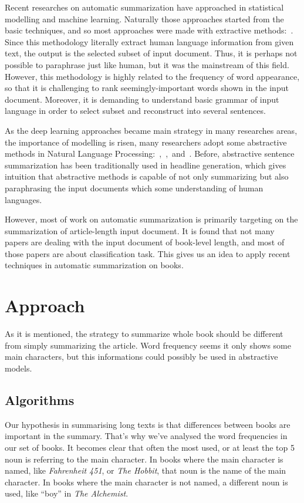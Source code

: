 Recent researches on automatic summarization have approached in statistical
modelling and machine learning. Naturally those approaches started from the
basic techniques, and so most approaches were made with extractive
methods:~\cite{2017arXiv170804439V}. Since this methodology literally extract
human language information from given text, the output is the selected subset
of input document. Thus, it is perhaps not possible to paraphrase just like
human, but it was the mainstream of this field. However, this methodology is
highly related to the frequency of word appearance, so that it is challenging
to rank seemingly-important words shown in the input document. Moreover, it is
demanding to understand basic grammar of input language in order to select
subset and reconstruct into several sentences.

As the deep learning approaches became main strategy in many researches areas,
the importance of modelling is risen, many researchers adopt some abstractive
methods in Natural Language
Processing:~\cite{2016arXiv160206023N},~\cite{2017arXiv170404368S},~and~\cite{Rush2015}.
Before, abstractive sentence summarization has been traditionally used in
headline generation, which gives intuition that abstractive methods is capable
of not only summarizing but also paraphrasing the input documents which some
understanding of human languages. 

However, most of work on automatic summarization is primarily targeting on
the summarization of article-length input document. It is found that not many
papers are dealing with the input document of book-level length, and most of
those papers are about classification task. This gives us an idea to apply
recent techniques in automatic summarization on books.


\section{Approach}
As it is mentioned, the strategy to summarize whole book should be different
from simply summarizing the article. Word frequency seems it only shows some
main characters, but this informations could possibly be used in abstractive
models. 


\subsection{Algorithms}

Our hypothesis in summarising long texts is that differences between books are
important in the summary. That's why we've analysed the word frequencies in our
set of books. It becomes clear that often the most used, or at least the top 5
noun is referring to the main character. In books where the main character is
named, like \textit{Fahrenheit 451}, or \textit{The Hobbit}, that noun is the
name of the main character. In books where the main character is not named, a
different noun is used, like ``boy'' in \textit{The Alchemist}.

